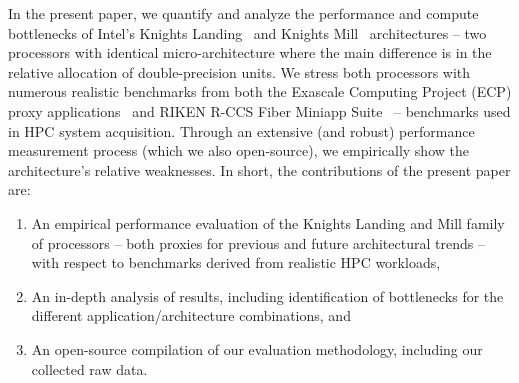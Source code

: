 In the present paper, we quantify and analyze the performance and compute bottlenecks of
Intel's Knights Landing~\cite{sodani_knights_2016} and Knights Mill~\cite{bradford_knights_2017} architectures -- two
processors with identical micro-architecture where the main difference is in the relative allocation of double-precision units.
We stress both processors with numerous realistic benchmarks from both the
Exascale Computing Project (ECP) proxy applications~\cite{noauthor_ecp_2018} and
RIKEN R-CCS Fiber Miniapp Suite~\cite{riken_aics_fiber_2015} -- benchmarks used in HPC system acquisition.
Through an extensive (and robust) performance measurement process (which we also open-source), we
empirically show the architecture's relative weaknesses. In short, the contributions of the present paper are:
\begin{enumerate}
    \item An empirical performance evaluation of the Knights Landing and Mill family of processors -- both proxies for previous and future architectural trends -- with respect to benchmarks derived from realistic HPC workloads,
    \item  An in-depth analysis of results, including identification of bottlenecks for the different application/architecture combinations, and
    \item An open-source compilation of our evaluation methodology, including our collected raw data.
\end{enumerate}
%
%

